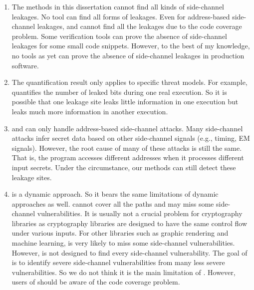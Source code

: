 \begin{enumerate}
\item The methods in this dissertation cannot find all kinds of side-channel leakages. No tool can find all forms of leakages. Even for address-based side-channel leakages, \tool{} and \ctool{} cannot find all the leakages due to the code coverage problem. Some verification tools can prove the absence of side-channel leakages for some small code snippets. However, to the best of my knowledge, no tools as yet can prove the absence of side-channel leakages in production software.
\item The quantification result only applies to specific threat models. For example,\tool{} quantifies the number of leaked bits during one real execution. So it is possible that one leakage site leaks little information in one execution but leaks much more information in another execution.
\item \tool{} and \ctool{} can only handle address-based side-channel attacks. Many side-channel attacks infer secret data based on other side-channel signals (e.g., timing, EM signals). However, the root cause of many of these attacks is still the same. That is, the program accesses different addresses when it processes different input secrets. Under the circumstance, our methods can still detect these leakage sites.
\item \ctool{} is a dynamic approach. So it bears the same limitations of dynamic approaches as well. \ctool{} cannot cover all the paths and may miss some side-channel vulnerabilities. It is usually not a crucial problem for cryptography libraries as cryptography libraries are designed to have the same control flow under various inputs. For other libraries such as graphic rendering and machine learning, \ctool{} is very likely to miss some side-channel vulnerabilities. However, \ctool{} is not designed to find every side-channel vulnerability. The goal of \ctool{} is to identify severe side-channel vulnerabilities from many less severe vulnerabilities. So we do not think it is the main limitation of \ctool{}. However, users of \ctool{} should be aware of the code coverage problem.
\end{enumerate}






 